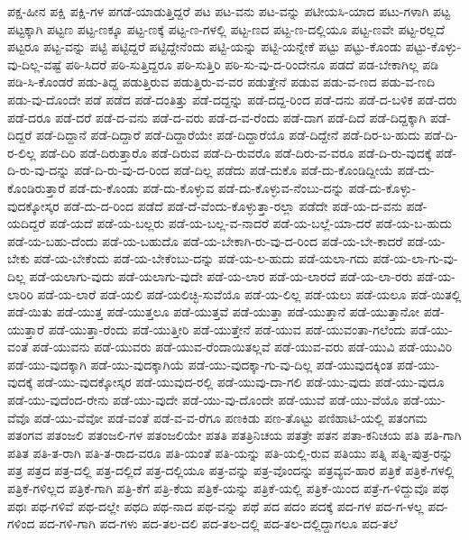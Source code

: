 {ಪಕ್ಷ-ಹೀನ
ಪಕ್ಷಿ
ಪಕ್ಷಿ-ಗಳ
ಪಗಡೆ-ಯಾಡುತ್ತಿದ್ದರೆ
ಪಟ
ಪಟ-ವನು
ಪಟ-ವನ್ನು
ಪಟೀಯಸಿ-ಯಾದ
ಪಟು-ಗಳಾಗಿ
ಪಟ್ಟ
ಪಟ್ಟಕ್ಕಾಗಿ
ಪಟ್ಟಣ
ಪಟ್ಟ-ಣಕ್ಕೂ
ಪಟ್ಟ-ಣಕ್ಕೆ
ಪಟ್ಟ-ಣ-ಗಳಲ್ಲಿ
ಪಟ್ಟ-ಣದ
ಪಟ್ಟ-ಣ-ದಲ್ಲಿಯೂ
ಪಟ್ಟ-ಣವೇ
ಪಟ್ಟ-ರಲ್ಲದೆ
ಪಟ್ಟರೂ
ಪಟ್ಟ-ವನ್ನು
ಪಟ್ಟಿ
ಪಟ್ಟಿದ್ದರೆ
ಪಟ್ಟಿದ್ದೇನೆಂದು
ಪಟ್ಟಿ-ಯನ್ನು
ಪಟ್ಟಿ-ಯನ್ನೇಕೆ
ಪಟ್ಟು
ಪಟ್ಟು-ಕೊಂಡು
ಪಟ್ಟು-ಕೊಳ್ಳು-ವು-ದಿಲ್ಲ-ವಷ್ಟೆ
ಪಠಿ-ಸಿದರೆ
ಪಠಿ-ಸುತ್ತಿದ್ದರೂ
ಪಠಿ-ಸುತ್ತಿರಿ
ಪಠಿ-ಸು-ವು-ದ-ರಿಂದೇನೂ
ಪಡದೆ
ಪಡ-ಬೇಕಾಗಿಲ್ಲ
ಪಡಿ
ಪಡಿ-ಸಿ-ಕೊಂಡರೆ
ಪಡು-ತಿದ್ದ
ಪಡುತ್ತಿರುವ
ಪಡುತ್ತಿರು-ವ-ವರ
ಪಡುತ್ತೇನೆ
ಪಡುವ
ಪಡು-ವ-ಣದ
ಪಡು-ವ-ಣದಿ
ಪಡು-ವು-ದೊಂದೇ
ಪಡೆ
ಪಡೆದ
ಪಡೆ-ದಂತಿತ್ತು
ಪಡೆ-ದದ್ದನ್ನು
ಪಡೆ-ದದ್ದ-ರಿಂದ
ಪಡೆ-ದನು
ಪಡೆ-ದ-ಬಳಿಕ
ಪಡೆ-ದರು
ಪಡೆ-ದರೂ
ಪಡೆ-ದರೆ
ಪಡೆ-ದ-ವನು
ಪಡೆ-ದ-ವರು
ಪಡೆ-ದ-ವ-ರೆಂದು
ಪಡೆ-ದಾಗ
ಪಡೆ-ದಿದೆ
ಪಡೆ-ದಿದ್ದಕ್ಕಾಗಿ
ಪಡೆ-ದಿದ್ದರೆ
ಪಡೆ-ದಿದ್ದಾನೆ
ಪಡೆ-ದಿದ್ದಾರೆ
ಪಡೆ-ದಿದ್ದಾರೆಯೇ
ಪಡೆ-ದಿದ್ದಾರೆಯೊ
ಪಡೆ-ದಿದ್ದೇನೆ
ಪಡೆ-ದಿರ-ಬ-ಹುದು
ಪಡೆ-ದಿ-ರ-ಲಿಲ್ಲ
ಪಡೆ-ದಿರಿ
ಪಡೆ-ದಿರುತ್ತಾರೊ
ಪಡೆ-ದಿರುವ
ಪಡೆ-ದಿ-ರುವರೊ
ಪಡೆ-ದಿರು-ವ-ವರೂ
ಪಡೆ-ದಿ-ರು-ವುದಕ್ಕೆ
ಪಡೆ-ದಿ-ರು-ವು-ದನ್ನು
ಪಡೆ-ದಿ-ರು-ವು-ದ-ರಿಂದ
ಪಡೆ-ದಿಲ್ಲ
ಪಡೆದು
ಪಡೆ-ದುಕೊ
ಪಡೆ-ದು-ಕೊಂಡಿದ್ದೀಯೆ
ಪಡೆ-ದು-ಕೊಂಡಿರುತ್ತಾರೆ
ಪಡೆ-ದು-ಕೊಂಡು
ಪಡೆ-ದು-ಕೊಳ್ಳುವ
ಪಡೆ-ದು-ಕೊಳ್ಳುವ-ನೆಂಬು-ದನ್ನು
ಪಡೆ-ದು-ಕೊಳ್ಳು-ವುದಕ್ಕೋಸ್ಕರ
ಪಡೆ-ದು-ದ-ರಿಂದ
ಪಡೆದೆ
ಪಡೆ-ದೆ-ವೆಂದು-ಕೊಳ್ಳುತ್ತಾ-ರಲ್ಲಾ
ಪಡೆದೇ
ಪಡೆ-ಯ-ದ-ವನು
ಪಡೆ-ಯದಿದ್ದರೆ
ಪಡೆ-ಯದೆ
ಪಡೆ-ಯ-ಬಲ್ಲರು
ಪಡೆ-ಯ-ಬಲ್ಲ-ವ-ನಾದರೆ
ಪಡೆ-ಯ-ಬಲ್ಲೆ-ಯಾ-ದರೆ
ಪಡೆ-ಯ-ಬ-ಹುದು
ಪಡೆ-ಯ-ಬಹು-ದೆಂದು
ಪಡೆ-ಯ-ಬಹುದೊ
ಪಡೆ-ಯ-ಬೇಕಾಗಿ-ರು-ವು-ದ-ರಿಂದ
ಪಡೆ-ಯ-ಬೇ-ಕಾದರೆ
ಪಡೆ-ಯ-ಬೇಕು
ಪಡೆ-ಯ-ಬೇಕೆಂದು
ಪಡೆ-ಯ-ಬೇಕೆಂಬು-ದನ್ನು
ಪಡೆ-ಯ-ಲ-ಹುದು
ಪಡೆ-ಯಲಾ-ಗದು
ಪಡೆ-ಯ-ಲಾ-ಗು-ವು-ದಿಲ್ಲ
ಪಡೆ-ಯಲಾಗು-ವುದು
ಪಡೆ-ಯಲಾಗು-ವುದೇ
ಪಡೆ-ಯ-ಲಾರ
ಪಡೆ-ಯ-ಲಾರದೆ
ಪಡೆ-ಯ-ಲಾ-ರರು
ಪಡೆ-ಯ-ಲಾರಿರಿ
ಪಡೆ-ಯ-ಲಾರೆ
ಪಡೆ-ಯಲಿ
ಪಡೆ-ಯಲಿಚ್ಛಿ-ಸುವೆಯೊ
ಪಡೆ-ಯ-ಲಿಲ್ಲ
ಪಡೆ-ಯಲು
ಪಡೆ-ಯಲೂ
ಪಡೆ-ಯಿತಲ್ಲಿ
ಪಡೆ-ಯಿತು
ಪಡೆ-ಯುತ್ತ
ಪಡೆ-ಯುತ್ತಲೂ
ಪಡೆ-ಯುತ್ತವೆ
ಪಡೆ-ಯುತ್ತಾ
ಪಡೆ-ಯುತ್ತಾನೆ
ಪಡೆ-ಯುತ್ತಾನೋ
ಪಡೆ-ಯುತ್ತಾರೆ
ಪಡೆ-ಯುತ್ತಾ-ರೆಂದು
ಪಡೆ-ಯುತ್ತೀರಿ
ಪಡೆ-ಯುತ್ತೇನೆ
ಪಡೆ-ಯುವ
ಪಡೆ-ಯುವಂತಾ-ಗಲೆಂದು
ಪಡೆ-ಯು-ವಂತೆ
ಪಡೆ-ಯುವನು
ಪಡೆ-ಯುವರು
ಪಡೆ-ಯುವ-ರೆಂದಾಯಿತಲ್ಲವೆ
ಪಡೆ-ಯುವ-ವರು
ಪಡೆ-ಯುವಿ
ಪಡೆ-ಯುವಿರಿ
ಪಡೆ-ಯು-ವುದಕ್ಕಾಗಿ
ಪಡೆ-ಯು-ವುದಕ್ಕಾಗಿಯೆ
ಪಡೆ-ಯು-ವುದಕ್ಕಾ-ಗು-ವು-ದಿಲ್ಲ
ಪಡೆ-ಯುವುದಕ್ಕಿಂತ
ಪಡೆ-ಯು-ವುದಕ್ಕೆ
ಪಡೆ-ಯು-ವುದಕ್ಕೋಸ್ಕರ
ಪಡೆ-ಯುವುದ-ರಲ್ಲಿ
ಪಡೆ-ಯುವು-ದಾ-ಗಲಿ
ಪಡೆ-ಯು-ವುದು
ಪಡೆ-ಯು-ವುದೂ
ಪಡೆ-ಯು-ವುದೆಂದ-ರೇನು
ಪಡೆ-ಯು-ವುದೇ
ಪಡೆ-ಯು-ವು-ದೊಂದೇ
ಪಡೆ-ಯುವೆ
ಪಡೆ-ಯು-ವೆಯೊ
ಪಡೆ-ಯು-ವೆವೊ
ಪಡೆ-ಯು-ವೆವೋ
ಪಡೆ-ವಂತೆ
ಪಡೆ-ವ-ವ-ರೆಗೂ
ಪಣಕಿಡು
ಪಣ-ತೊಟ್ಟು
ಪಣಿಹಾಟಿ-ಯಲ್ಲಿ
ಪತಂಗಮ
ಪತಂಗವ
ಪತಂಜಲಿ
ಪತಂಜಲಿ-ಗಳ
ಪತಂಜಲಿಯೇ
ಪತತಿ
ಪತತ್ರಿನಿಚಯ
ಪತತ್ರೇ
ಪತನ
ಪತಾ-ಕನಿಚಯ
ಪತಿ
ಪತಿ-ಗಾಗಿ
ಪತಿತ
ಪತಿ-ತ-ರಾಗಿ
ಪತಿ-ತ-ರಾದ-ವರೂ
ಪತಿ-ಯಂತೆ
ಪತಿ-ಯನ್ನು
ಪತಿ-ಯಲ್ಲಿ-ರುವ
ಪತಿಯು
ಪತ್ನಿ
ಪತ್ನಿ-ಪುತ್ರ-ರನ್ನು
ಪತ್ರ
ಪತ್ರದ
ಪತ್ರ-ದಲ್ಲಿ
ಪತ್ರ-ದಲ್ಲಿದೆ
ಪತ್ರ-ದಲ್ಲಿಯೂ
ಪತ್ರ-ವನ್ನು
ಪತ್ರ-ವೊಂದನ್ನು
ಪತ್ರವ್ಯವ-ಹಾರ
ಪತ್ರಿಕೆ
ಪತ್ರಿಕೆ-ಗಳಲ್ಲಿ
ಪತ್ರಿಕೆ-ಗಳಿಲ್ಲದ
ಪತ್ರಿಕೆ-ಗಾಗಿ
ಪತ್ರಿ-ಕೆಗೆ
ಪತ್ರಿ-ಕೆಯ
ಪತ್ರಿಕೆ-ಯನ್ನು
ಪತ್ರಿಕೆ-ಯಲ್ಲಿ
ಪತ್ರಿಕೆ-ಯಿಂದ
ಪತ್ರೆ-ಗ-ಳಿದ್ದುವೊ
ಪಥ
ಪಥಃ
ಪಥ-ಗಳಿವೆ
ಪಥ-ದಲ್ಲೇ
ಪಥದಿ
ಪಥ-ನಾದ
ಪಥ-ವನ್ನು
ಪಥೆ
ಪದ
ಪದಂ
ಪದಕ್ಕೆ
ಪದ-ಗಳ
ಪದ-ಗ-ಳಲ್ಲ
ಪದ-ಗಳಿಂದ
ಪದ-ಗಳಿ-ಗಾಗಿ
ಪದ-ಗಳು
ಪದ-ತಲ-ದಲಿ
ಪದ-ತಲ-ದಲ್ಲಿ
ಪದ-ತಲ-ದಲ್ಲಿದ್ದಾಗಲೂ
ಪದ-ತಲೆ
}
